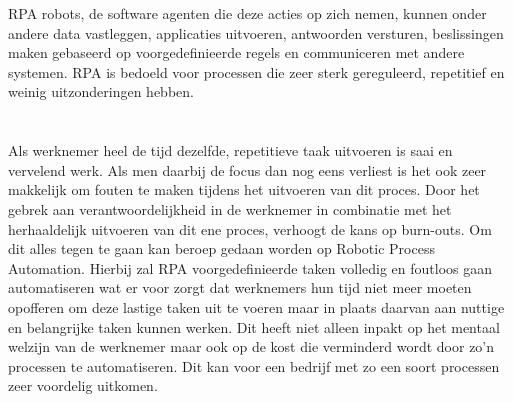 RPA robots, de software agenten die deze acties op zich nemen, kunnen onder andere data vastleggen, applicaties uitvoeren, antwoorden versturen, beslissingen maken gebaseerd op voorgedefinieerde regels en communiceren met andere systemen. RPA is bedoeld voor processen die zeer sterk gereguleerd, repetitief en weinig uitzonderingen hebben.

\section{}
\label{sec:probleemstelling}


Als werknemer heel de tijd dezelfde, repetitieve taak uitvoeren is saai en vervelend werk. Als men daarbij de focus dan nog eens verliest is het ook zeer makkelijk om fouten te maken tijdens het uitvoeren van dit proces. Door het gebrek aan verantwoordelijkheid in de werknemer in combinatie met het herhaaldelijk uitvoeren van dit ene proces, verhoogt de kans op burn-outs. Om dit alles tegen te gaan kan beroep gedaan worden op Robotic Process Automation. Hierbij zal RPA voorgedefinieerde taken volledig en foutloos gaan automatiseren wat er voor zorgt dat werknemers hun tijd niet meer moeten opofferen om deze lastige taken uit te voeren maar in plaats daarvan aan nuttige en belangrijke taken kunnen werken. Dit heeft niet alleen inpakt op het mentaal welzijn van de werknemer maar ook op de kost die verminderd wordt door zo'n processen te automatiseren. Dit kan voor een bedrijf met zo een soort processen zeer voordelig uitkomen.

\section{}
\label{sec:onderzoeksvraag}

